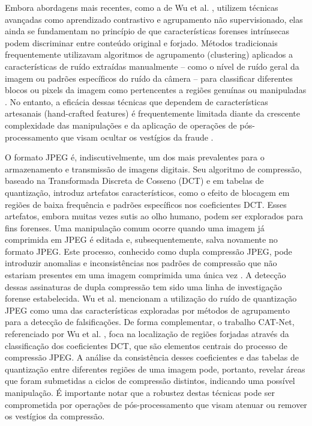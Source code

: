 Embora abordagens mais recentes, como a de Wu et al. \cite{wu2023rethinking}, utilizem técnicas avançadas como aprendizado contrastivo e agrupamento não supervisionado, elas ainda se fundamentam no princípio de que características forenses intrínsecas podem discriminar entre conteúdo original e forjado. Métodos tradicionais frequentemente utilizavam algoritmos de agrupamento (clustering) aplicados a características de ruído extraídas manualmente – como o nível de ruído geral da imagem ou padrões específicos do ruído da câmera – para classificar diferentes blocos ou pixels da imagem como pertencentes a regiões genuínas ou manipuladas \cite{wu2023rethinking}. No entanto, a eficácia dessas técnicas que dependem de características artesanais (hand-crafted features) é frequentemente limitada diante da crescente complexidade das manipulações e da aplicação de operações de pós-processamento que visam ocultar os vestígios da fraude \cite{wu2023rethinking}.


O formato JPEG é, indiscutivelmente, um dos mais prevalentes para o armazenamento e transmissão de imagens digitais. Seu algoritmo de compressão, baseado na Transformada Discreta de Cosseno (DCT) e em tabelas de quantização, introduz artefatos característicos, como o efeito de blocagem em regiões de baixa frequência e padrões específicos nos coeficientes DCT. Esses artefatos, embora muitas vezes sutis ao olho humano, podem ser explorados para fins forenses. Uma manipulação comum ocorre quando uma imagem já comprimida em JPEG é editada e, subsequentemente, salva novamente no formato JPEG. Este processo, conhecido como dupla compressão JPEG, pode introduzir anomalias e inconsistências nos padrões de compressão que não estariam presentes em uma imagem comprimida uma única vez \cite{zhou2018manipulation}. A detecção dessas assinaturas de dupla compressão tem sido uma linha de investigação forense estabelecida. Wu et al. \cite{wu2023rethinking} mencionam a utilização do ruído de quantização JPEG como uma das características exploradas por métodos de agrupamento para a detecção de falsificações. De forma complementar, o trabalho CAT-Net, referenciado por Wu et al. \cite{wu2023rethinking}, foca na localização de regiões forjadas através da classificação dos coeficientes DCT, que são elementos centrais do processo de compressão JPEG. A análise da consistência desses coeficientes e das tabelas de quantização entre diferentes regiões de uma imagem pode, portanto, revelar áreas que foram submetidas a ciclos de compressão distintos, indicando uma possível manipulação. É importante notar que a robustez destas técnicas pode ser comprometida por operações de pós-processamento que visam atenuar ou remover os vestígios da compressão.

